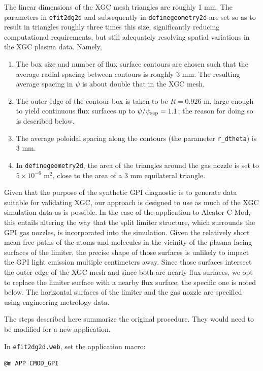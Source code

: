 \documentclass[12pt]{report}
\begin{document}
The linear dimensions of the XGC mesh
triangles are roughly 1 mm.  The parameters in {\tt efit2dg2d}
and subsequently in {\tt definegeometry2d} are set so as
to result in triangles roughly three times this size,
significantly reducing computational requirements, but still
adequately resolving spatial variations in the XGC plasma
data.  Namely,
\begin{enumerate}
\item The box size and number of flux surface contours are
  chosen such that the average radial spacing between contours
  is roughly 3 mm. The resulting average spacing in $\psi$
  is about double that in the XGC mesh.
\item The outer edge of the contour box is taken to be 
  $R = 0.926$ m, large enough to yield continuous
  flux surfaces up to $\psi / \psi_{\rm sep} = 1.1$; the reason
  for doing so is described below.
\item The average poloidal spacing along the contours
  (the parameter {\tt r\_dtheta}) is 3 mm.
\item In {\tt definegeometry2d}, the area of the triangles
  around the gas nozzle is set to $5 \times 10^{-6}$
  m$^{2}$, close to the area of a 3 mm equilateral triangle.
\end{enumerate}

Given that the purpose of the synthetic GPI diagnostic is
to generate data suitable for validating XGC, our approach
is designed to use as much of the XGC simulation data as
is possible.  In the case of the application to Alcator
C-Mod, this entails altering the way that the split limiter
structure, which surrounds the GPI gas nozzles, is
incorporated into the simulation.  Given the relatively short
mean free paths of the atoms and molecules in the
vicinity of the plasma
facing surfaces of the limiter, the precise shape of those
surfaces is unlikely to impact the GPI light emission multiple
centimeters away.  Since those surfaces intersect the outer edge
of the XGC mesh and since both are nearly flux surfaces, we
opt to replace the limiter surface with a nearby flux surface;
the specific one is noted below.  The horizontal surfaces
of the limiter and the gas nozzle
are specified using engineering metrology
data.


The steps described here summarize the original procedure.
They would
need to be modified for a new application.

In {\tt efit2dg2d.web}, set the application macro:

\begin{verbatim}
@m APP CMOD_GPI
\end{verbatim}
\end{document}
